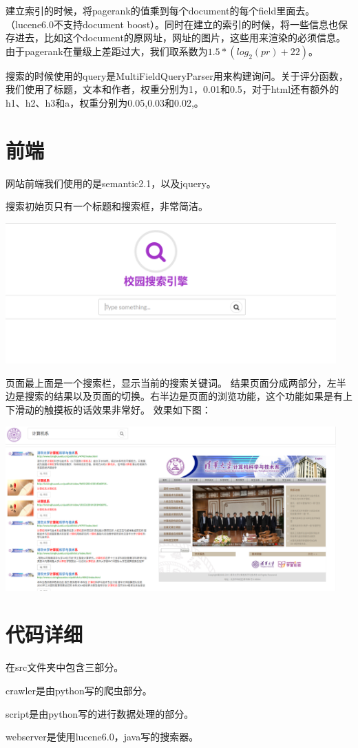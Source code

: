 \documentclass[11pt, a4paper]{article}
\begin{document}
建立索引的时候，将pagerank的值乘到每个document的每个field里面去。（lucene6.0不支持document boost）。同时在建立的索引的时候，将一些信息也保存进去，比如这个document的原网址，网址的图片，这些用来渲染的必须信息。由于pagerank在量级上差距过大，我们取系数为\(1.5*(log_2(pr)+22)\)。

搜索的时候使用的query是MultiFieldQueryParser用来构建询问。关于评分函数，我们使用了标题，文本和作者，权重分别为1，0.01和0.5，对于html还有额外的h1、h2、h3和a，权重分别为0.05,0.03和0.02,。

\section{前端}
网站前端我们使用的是semantic2.1，以及jquery。

搜索初始页只有一个标题和搜索框，非常简洁。

\begin{center}
    \includegraphics[width=5in]{index}
\end{center}

页面最上面是一个搜索栏，显示当前的搜索关键词。
结果页面分成两部分，左半边是搜索的结果以及页面的切换。右半边是页面的浏览功能，这个功能如果是有上下滑动的触摸板的话效果非常好。
效果如下图：

\begin{center}
    \includegraphics[width=5in]{result}
\end{center}

\section{代码详细}
在src文件夹中包含三部分。

crawler是由python写的爬虫部分。

script是由python写的进行数据处理的部分。

webserver是使用lucene6.0，java写的搜索器。
\end{document}
